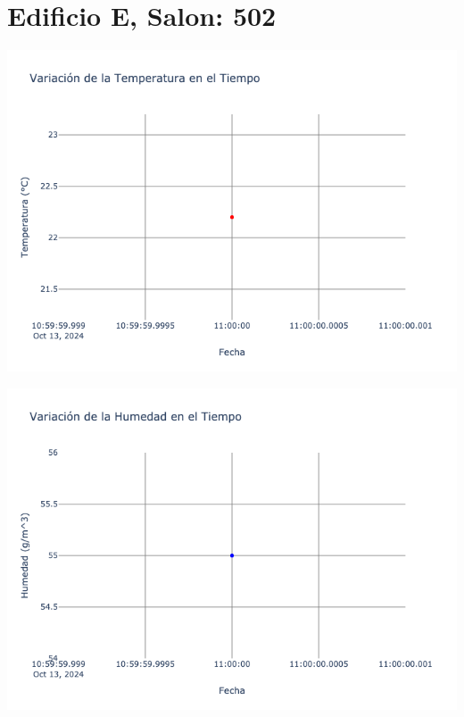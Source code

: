 \documentclass{article}
\begin{document}
    \section{Edificio E, Salon: 502}
    \noindent
    \begin{minipage}{0.48\textwidth}
        \centering
        \includegraphics[width=\textwidth]{../img/poli/TS502-90Dias-03-12-2024.png}
    \end{minipage}
    \hfill
    \begin{minipage}{0.48\textwidth}
        \centering
        \includegraphics[width=\textwidth]{../img/poli/HS502-90Dias-03-12-2024.png}
    \end{minipage}
\end{document}
